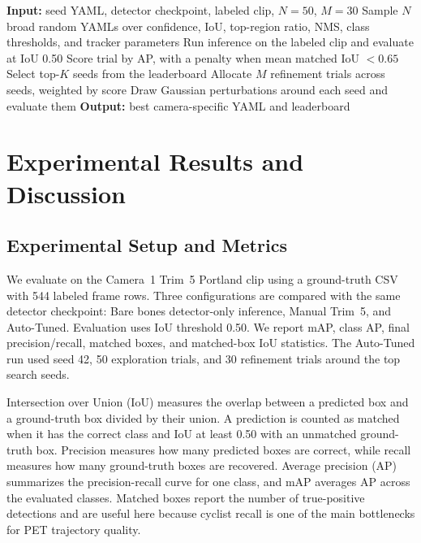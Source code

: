 \documentclass[conference]{IEEEtran}
\begin{document}
\begin{algorithm}[t]
\caption{Camera-Specific Auto-Tuning}
\label{alg:tuning}
\begin{algorithmic}[1]
\State \textbf{Input:} seed YAML, detector checkpoint, labeled clip, $N=50$, $M=30$
\State Sample $N$ broad random YAMLs over confidence, IoU, top-region ratio, NMS, class thresholds, and tracker parameters
    \State Run inference on the labeled clip and evaluate at IoU 0.50
    \State Score trial by AP, with a penalty when mean matched IoU $<0.65$
\EndFor
\State Select top-$K$ seeds from the leaderboard
\State Allocate $M$ refinement trials across seeds, weighted by score
\State Draw Gaussian perturbations around each seed and evaluate them
\State \textbf{Output:} best camera-specific YAML and leaderboard
\end{algorithmic}
\end{algorithm}

\section{Experimental Results and Discussion}
\label{sec:experiments}

\subsection{Experimental Setup and Metrics}

We evaluate on the Camera~1 Trim~5 Portland clip using a ground-truth CSV with 544 labeled frame rows. Three configurations are compared with the same detector checkpoint: Bare bones detector-only inference, Manual Trim~5, and Auto-Tuned. Evaluation uses IoU threshold 0.50. We report mAP, class AP, final precision/recall, matched boxes, and matched-box IoU statistics. The Auto-Tuned run used seed 42, 50 exploration trials, and 30 refinement trials around the top search seeds.

Intersection over Union (IoU) measures the overlap between a predicted box and a ground-truth box divided by their union. A prediction is counted as matched when it has the correct class and IoU at least 0.50 with an unmatched ground-truth box. Precision measures how many predicted boxes are correct, while recall measures how many ground-truth boxes are recovered. Average precision (AP) summarizes the precision-recall curve for one class, and mAP averages AP across the evaluated classes. Matched boxes report the number of true-positive detections and are useful here because cyclist recall is one of the main bottlenecks for PET trajectory quality.
\end{document}
